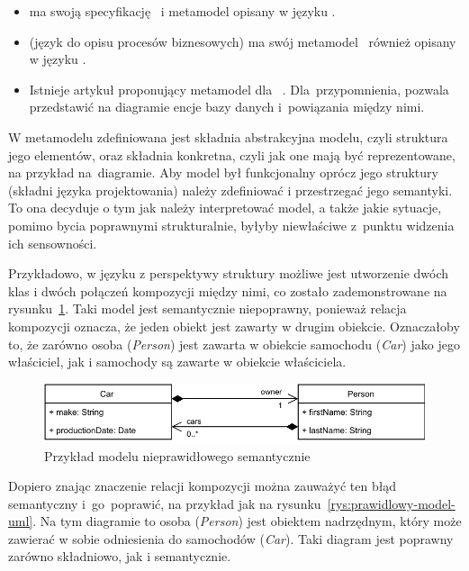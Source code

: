 \begin{itemize}
	\item {} ma swoją specyfikację~\cite{uml-omg-specification}
	      i metamodel opisany w języku .

	\item {} (język do opisu procesów biznesowych) ma swój
	      metamodel~\cite{bpmn-omg-specification} również opisany w języku .

	\item Istnieje artykuł proponujący metamodel dla ~\cite{entity-relationship-metamodel}. Dla~przypomnienia,  pozwala przedstawić na diagramie encje bazy danych i~powiązania między nimi.
\end{itemize}

W metamodelu zdefiniowana jest składnia abstrakcyjna modelu, czyli struktura
jego elementów, oraz składnia konkretna, czyli jak one mają być reprezentowane,
na przykład na~diagramie.
Aby model był funkcjonalny oprócz jego struktury (składni języka projektowania)
należy zdefiniować i przestrzegać jego semantyki. To ona decyduje o tym jak
należy interpretować model, a także jakie sytuacje, pomimo bycia poprawnymi
strukturalnie, byłyby niewłaściwe z~punktu widzenia ich sensowności.

Przykładowo, w języku  z perspektywy struktury możliwe jest
utworzenie dwóch klas i dwóch połączeń kompozycji między nimi, co zostało
zademonstrowane na rysunku~\ref{rys:nieprawidlowy-model-uml}. Taki model jest
semantycznie niepoprawny, ponieważ relacja kompozycji oznacza, że jeden obiekt
jest zawarty w drugim obiekcie. Oznaczałoby to, że zarówno osoba
(\emph{Person}) jest zawarta w obiekcie samochodu (\emph{Car}) jako jego
właściciel, jak i samochody są zawarte w obiekcie właściciela.

\begin{figure}[!hb]
	\centering

	\includegraphics[width=0.95\linewidth]{./images/invalid-uml-example.pdf}
	\caption{Przykład modelu  nieprawidłowego
		semantycznie}\label{rys:nieprawidlowy-model-uml}
\end{figure}

Dopiero znając znaczenie relacji kompozycji można zauważyć ten błąd semantyczny
i~go~poprawić, na przykład jak na rysunku~\ref{rys:prawidlowy-model-uml}. Na
tym diagramie to osoba (\emph{Person}) jest obiektem nadrzędnym, który może
zawierać w sobie odniesienia do samochodów (\emph{Car}). Taki diagram jest
poprawny zarówno składniowo, jak i semantycznie.

